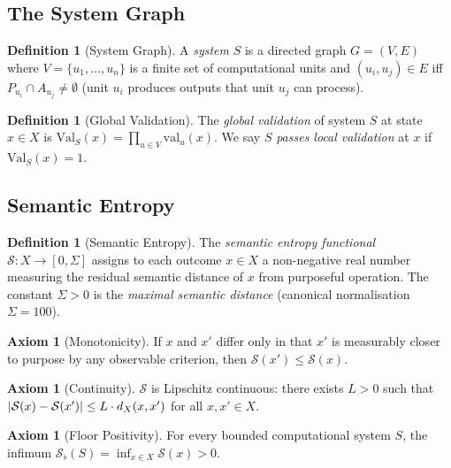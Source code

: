 \documentclass[twocolumn,a4paper,11pt]{article}
\theoremstyle{plain}
\theoremstyle{definition}
\newtheorem{definition}[theorem]{Definition}
\newtheorem{axiom}[theorem]{Axiom}
\theoremstyle{remark}
\DeclarePairedDelimiter{\abs}{\lvert}{\rvert}
\newcommand{\Val}{\mathrm{Val}}
\newcommand{\Sflat}{\mathcal{S}_{\flat}}
\begin{document}
\subsection{The System Graph}

\begin{definition}[System Graph]
\label{def:system-graph}
A \emph{system} $S$ is a directed graph $G = (V, E)$ where $V = \{u_1,
\ldots, u_n\}$ is a finite set of computational units and
$(u_i, u_j) \in E$ iff $P_{u_i} \cap A_{u_j} \neq \emptyset$ (unit
$u_i$ produces outputs that unit $u_j$ can process).
\end{definition}

\begin{definition}[Global Validation]
\label{def:global-val}
The \emph{global validation} of system $S$ at state $x \in X$ is
$\Val_S(x) = \prod_{u \in V} \mathrm{val}_u(x)$. We say $S$ \emph{passes
local validation} at $x$ if $\Val_S(x) = 1$.
\end{definition}

\subsection{Semantic Entropy}

\begin{definition}[Semantic Entropy]
\label{def:s-entropy}
The \emph{semantic entropy functional} $\mathcal{S}: X \to [0, \Sigma]$
assigns to each outcome $x \in X$ a non-negative real number measuring
the residual semantic distance of $x$ from purposeful operation. The
constant $\Sigma > 0$ is the \emph{maximal semantic distance} (canonical
normalisation $\Sigma = 100$).
\end{definition}

\begin{axiom}[Monotonicity]
\label{ax:monotone}
If $x$ and $x'$ differ only in that $x'$ is measurably closer to purpose
by any observable criterion, then $\mathcal{S}(x') \leq \mathcal{S}(x)$.
\end{axiom}

\begin{axiom}[Continuity]
\label{ax:continuity}
$\mathcal{S}$ is Lipschitz continuous: there exists $L > 0$ such that
$\abs{\mathcal{S}(x) - \mathcal{S}(x')} \leq L \cdot d_X(x, x')$ for
all $x, x' \in X$.
\end{axiom}

\begin{axiom}[Floor Positivity]
\label{ax:floor}
For every bounded computational system $S$, the infimum
$\Sflat(S) = \inf_{x \in X} \mathcal{S}(x) > 0$.
\end{axiom}
\end{document}
